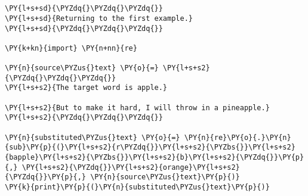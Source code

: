 

\section*{}

\begin{Verbatim}[commandchars=\\\{\}]
\PY{l+s+sd}{\PYZdq{}\PYZdq{}\PYZdq{}}
\PY{l+s+sd}{Returning to the first example.}
\PY{l+s+sd}{\PYZdq{}\PYZdq{}\PYZdq{}}

\PY{k+kn}{import} \PY{n+nn}{re}

\PY{n}{source\PYZus{}text} \PY{o}{=} \PY{l+s+s2}{\PYZdq{}\PYZdq{}\PYZdq{}}
\PY{l+s+s2}{The target word is apple.}

\PY{l+s+s2}{But to make it hard, I will throw in a pineapple.}
\PY{l+s+s2}{\PYZdq{}\PYZdq{}\PYZdq{}}

\PY{n}{substituted\PYZus{}text} \PY{o}{=} \PY{n}{re}\PY{o}{.}\PY{n}{sub}\PY{p}{(}\PY{l+s+s2}{r\PYZdq{}}\PY{l+s+s2}{\PYZbs{}}\PY{l+s+s2}{bapple}\PY{l+s+s2}{\PYZbs{}}\PY{l+s+s2}{b}\PY{l+s+s2}{\PYZdq{}}\PY{p}{,} \PY{l+s+s2}{\PYZdq{}}\PY{l+s+s2}{orange}\PY{l+s+s2}{\PYZdq{}}\PY{p}{,} \PY{n}{source\PYZus{}text}\PY{p}{)}
\PY{k}{print}\PY{p}{(}\PY{n}{substituted\PYZus{}text}\PY{p}{)}
\end{Verbatim}
